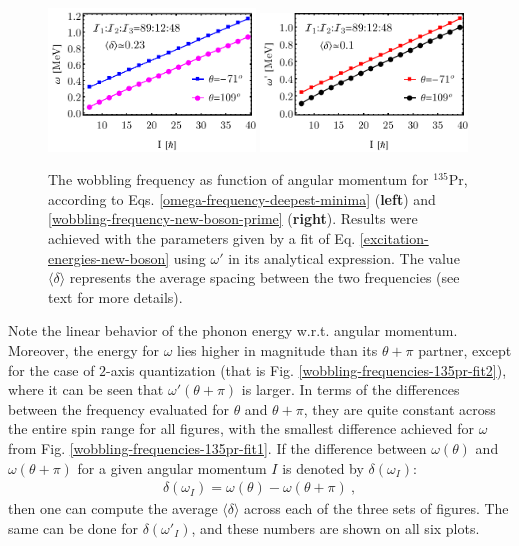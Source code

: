 \begin{figure}
    \centering
    \includegraphics[width=0.49\textwidth]{Chapters/Figures/omega-fit-3.pdf}
    \includegraphics[width=0.49\textwidth]{Chapters/Figures/omega-prime-fit-3.pdf}
    \caption{The wobbling frequency as function of angular momentum for $^{135}$Pr, according to Eqs. \ref{omega-frequency-deepest-minima} (\textbf{left}) and \ref{wobbling-frequency-new-boson-prime} (\textbf{right}). Results were achieved with the parameters given by a fit of Eq. \ref{excitation-energies-new-boson} using $\omega'$ in its analytical expression. The value $\langle\delta\rangle$ represents the average spacing between the two frequencies (see text for more details).}
    \label{wobbling-frequencies-135pr-fit3}
\end{figure}

Note the linear behavior of the phonon energy w.r.t. angular momentum. Moreover, the energy for $\omega$ lies higher in magnitude than its $\theta+\pi$ partner, except for the case of $2$-axis quantization (that is Fig. \ref{wobbling-frequencies-135pr-fit2}), where it can be seen that $\omega'(\theta+\pi)$ is larger. In terms of the differences between the frequency evaluated for $\theta$ and $\theta+\pi$, they are quite constant across the entire spin range for all figures, with the smallest difference achieved for $\omega$ from Fig. \ref{wobbling-frequencies-135pr-fit1}. If the difference between $\omega(\theta)$ and $\omega(\theta+\pi)$ for a given angular momentum $I$ is denoted by $\delta(\omega_I)$:
\begin{align}
\delta(\omega_I)=\omega(\theta)-\omega(\theta+\pi)\ ,    
\end{align}
then one can compute the average $\langle\delta\rangle$ across each of the three sets of figures. The same can be done for $\delta(\omega'_I)$, and these numbers are shown on all six plots.

